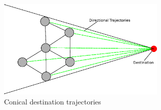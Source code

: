 \begin{figure}[H]
\begin{center}
\includegraphics[width=8cm]{CHAPTER-6/figures/ConicalPath}
\end{center}
\caption{Conical destination trajectories\label{reduced:ConicalPath}}
\end{figure}

